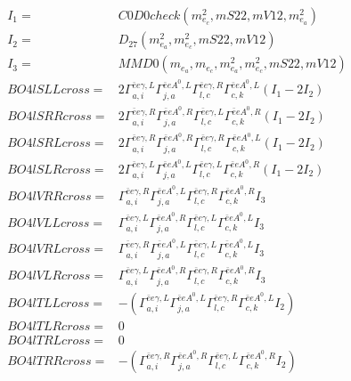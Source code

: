 \documentclass[A4,landscape]{article}
\begin{document}
\begin{align} 
I_1 = & C0D0check(m^2_{e_{{c}}}, mS22, mV12, m^2_{e_{{a}}}) \\ 
I_2 = & D_{27}(m^2_{e_{{a}}}, m^2_{e_{{c}}}, mS22, mV12) \\ 
I_3 = & MMD0(m_{e_{{a}}}, m_{e_{{c}}}, m^2_{e_{{a}}}, m^2_{e_{{c}}}, mS22, mV12) \\ 
  BO4lSLLcross= & 2  \Gamma^{\bar{e}e \gamma ,L}_{a, i} \Gamma^{\bar{e}e A^0 ,L}_{j, a} \Gamma^{\bar{e}e \gamma ,R}_{l, c} \Gamma^{\bar{e}e A^0 ,L}_{c, k} (I_1 - 2 I_2) \\ 
  BO4lSRRcross= & 2  \Gamma^{\bar{e}e \gamma ,R}_{a, i} \Gamma^{\bar{e}e A^0 ,R}_{j, a} \Gamma^{\bar{e}e \gamma ,L}_{l, c} \Gamma^{\bar{e}e A^0 ,R}_{c, k} (I_1 - 2 I_2) \\ 
  BO4lSRLcross= & 2  \Gamma^{\bar{e}e \gamma ,R}_{a, i} \Gamma^{\bar{e}e A^0 ,R}_{j, a} \Gamma^{\bar{e}e \gamma ,R}_{l, c} \Gamma^{\bar{e}e A^0 ,L}_{c, k} (I_1 - 2 I_2) \\ 
  BO4lSLRcross= & 2  \Gamma^{\bar{e}e \gamma ,L}_{a, i} \Gamma^{\bar{e}e A^0 ,L}_{j, a} \Gamma^{\bar{e}e \gamma ,L}_{l, c} \Gamma^{\bar{e}e A^0 ,R}_{c, k} (I_1 - 2 I_2) \\ 
  BO4lVRRcross= &  \Gamma^{\bar{e}e \gamma ,R}_{a, i} \Gamma^{\bar{e}e A^0 ,L}_{j, a} \Gamma^{\bar{e}e \gamma ,R}_{l, c} \Gamma^{\bar{e}e A^0 ,R}_{c, k} I_3 \\ 
  BO4lVLLcross= &  \Gamma^{\bar{e}e \gamma ,L}_{a, i} \Gamma^{\bar{e}e A^0 ,R}_{j, a} \Gamma^{\bar{e}e \gamma ,L}_{l, c} \Gamma^{\bar{e}e A^0 ,L}_{c, k} I_3 \\ 
  BO4lVRLcross= &  \Gamma^{\bar{e}e \gamma ,R}_{a, i} \Gamma^{\bar{e}e A^0 ,L}_{j, a} \Gamma^{\bar{e}e \gamma ,L}_{l, c} \Gamma^{\bar{e}e A^0 ,L}_{c, k} I_3 \\ 
  BO4lVLRcross= &  \Gamma^{\bar{e}e \gamma ,L}_{a, i} \Gamma^{\bar{e}e A^0 ,R}_{j, a} \Gamma^{\bar{e}e \gamma ,R}_{l, c} \Gamma^{\bar{e}e A^0 ,R}_{c, k} I_3 \\ 
  BO4lTLLcross= & -( \Gamma^{\bar{e}e \gamma ,L}_{a, i} \Gamma^{\bar{e}e A^0 ,L}_{j, a} \Gamma^{\bar{e}e \gamma ,R}_{l, c} \Gamma^{\bar{e}e A^0 ,L}_{c, k} I_2) \\ 
  BO4lTLRcross= & 0 \\ 
  BO4lTRLcross= & 0 \\ 
  BO4lTRRcross= & -( \Gamma^{\bar{e}e \gamma ,R}_{a, i} \Gamma^{\bar{e}e A^0 ,R}_{j, a} \Gamma^{\bar{e}e \gamma ,L}_{l, c} \Gamma^{\bar{e}e A^0 ,R}_{c, k} I_2) \\ 
\end{align} 
\end{document}

